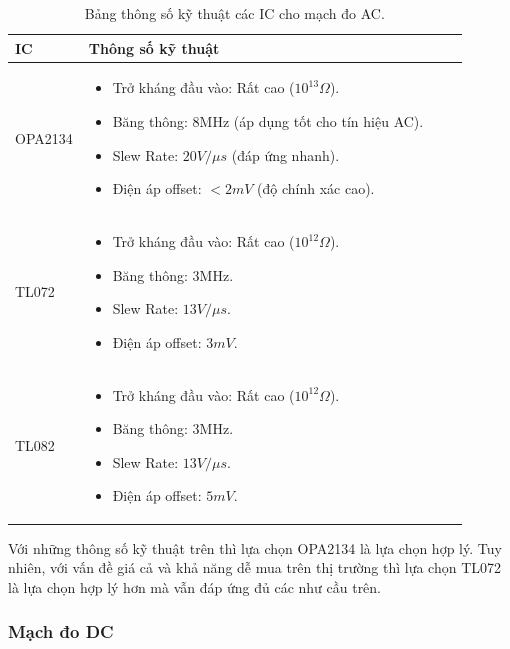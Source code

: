 		\begin{table}[H]
			\centering
			\begin{tabular}{|>{\centering\arraybackslash}p{0.1\linewidth}|p{0.8\linewidth}|}
				\hline
				\textbf{IC} & \textbf{Thông số kỹ thuật} \\ \hline
				OPA2134     & \begin{itemize}
					\item Trở kháng đầu vào: Rất cao ($10^{13} \Omega$).
					\item Băng thông: 8MHz (áp dụng tốt cho tín hiệu AC).
					\item Slew Rate: $20V/\mu s$ (đáp ứng nhanh).
					\item Điện áp offset: $<2mV$ (độ chính xác cao). 		
				\end{itemize} \\ \hline
				TL072       & \begin{itemize}
					\item Trở kháng đầu vào: Rất cao ($10^{12} \Omega$).
					\item Băng thông: 3MHz.
					\item Slew Rate: $13V/\mu s$.
					\item Điện áp offset: $3mV$. 		
				\end{itemize} \\ \hline
				TL082       & \begin{itemize}
					\item Trở kháng đầu vào: Rất cao ($10^{12} \Omega$).
					\item Băng thông: 3MHz.
					\item Slew Rate: $13V/\mu s$.
					\item Điện áp offset: $5mV$. 		
				\end{itemize} \\ \hline
			\end{tabular}
			
			\caption{Bảng thông số kỹ thuật các IC cho mạch đo AC.}
			\label{tab:ic_AC}
		\end{table}
		
		Với những thông số kỹ thuật trên thì lựa chọn OPA2134 là lựa chọn hợp lý. Tuy nhiên, với vấn đề giá cả và khả năng dễ mua trên thị trường thì lựa chọn TL072 là lựa chọn hợp lý hơn mà vẫn đáp ứng đủ các như cầu trên.
		
	\subsubsection{Mạch đo DC}
	
